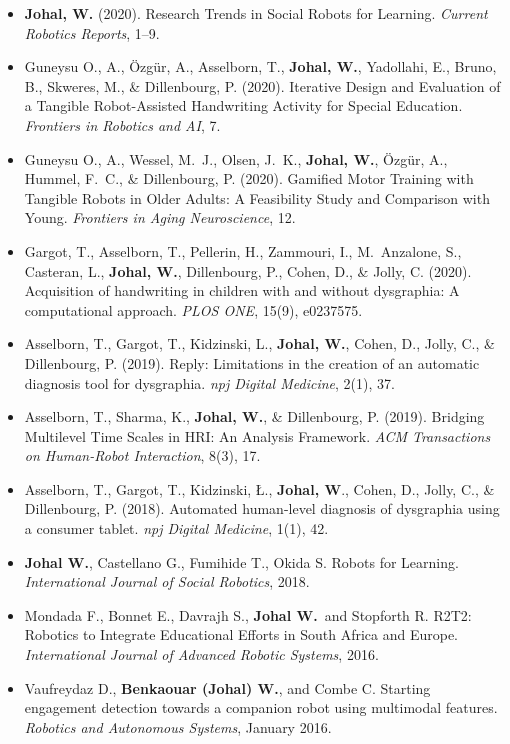 \begin{itemize}[nosep]
    \item \textbf{Johal, W.} (2020). Research Trends in Social Robots for Learning. \textit{Current Robotics Reports}, 1--9.

    \item Guneysu O., A., Özgür, A., Asselborn, T., \textbf{Johal, W.}, Yadollahi, E., Bruno, B., Skweres, M., \& Dillenbourg, P. (2020). Iterative Design and Evaluation of a Tangible Robot-Assisted Handwriting Activity for Special Education. \textit{Frontiers in Robotics and AI}, 7.

    \item Guneysu O., A., Wessel, M.\ J., Olsen, J.\ K., \textbf{Johal, W.}, Özgür, A., Hummel, F.\ C., \& Dillenbourg, P. (2020). Gamified Motor Training with Tangible Robots in Older Adults: A Feasibility Study and Comparison with Young. \textit{Frontiers in Aging Neuroscience}, 12.

    \item Gargot, T., Asselborn, T., Pellerin, H., Zammouri, I., M.\ Anzalone, S., Casteran, L., \textbf{Johal, W.}, Dillenbourg, P., Cohen, D., \& Jolly, C. (2020). Acquisition of handwriting in children with and without dysgraphia: A computational approach. \textit{PLOS ONE}, 15(9), e0237575.

    \item Asselborn, T., Gargot, T., Kidzinski, L., \textbf{Johal, W.}, Cohen, D., Jolly, C., \& Dillenbourg, P. (2019). Reply: Limitations in the creation of an automatic diagnosis tool for dysgraphia. \textit{npj Digital Medicine}, 2(1), 37.

    \item Asselborn, T., Sharma, K., \textbf{Johal, W.}, \& Dillenbourg, P. (2019). Bridging Multilevel Time Scales in HRI: An Analysis Framework. \textit{ACM Transactions on Human-Robot Interaction}, 8(3), 17.

    \item Asselborn, T., Gargot, T., Kidzinski, Ł., \textbf{Johal, W}., Cohen, D., Jolly, C., \& Dillenbourg, P. (2018). Automated human-level diagnosis of dysgraphia using a consumer tablet. \textit{npj Digital Medicine}, 1(1), 42.

    \item \textbf{Johal W.}, Castellano G., Fumihide T., Okida S. Robots for Learning. \textit{International Journal of Social Robotics}, 2018.

    \item Mondada F., Bonnet E., Davrajh S., \textbf{Johal W.}\ and Stopforth R. R2T2: Robotics to Integrate Educational Efforts in South Africa and Europe. \textit{International Journal of Advanced Robotic Systems}, 2016.

    \item Vaufreydaz D., \textbf{Benkaouar (Johal) W.}, and Combe C. Starting engagement detection towards a companion robot using multimodal features. \textit{Robotics and Autonomous Systems}, January 2016.
\end{itemize}

